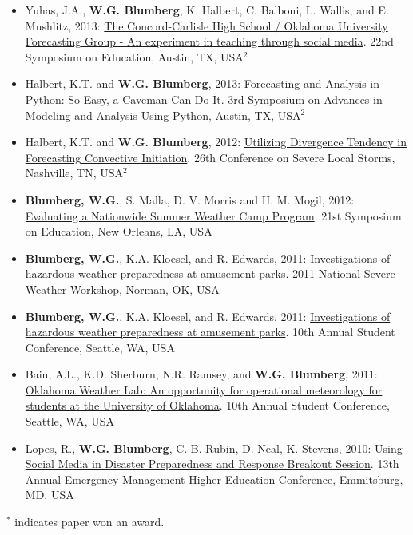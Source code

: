 \documentclass[10pt]{res} %
\begin{document}
\begin{resume}
\begin{itemize}
\item Yuhas, J.A., \textbf{W.G. Blumberg}, K. Halbert, C. Balboni, L. Wallis, and E. Mushlitz, 2013: \href{https://ams.confex.com/ams/93Annual/webprogram/Paper221498.html}{The Concord-Carlisle High School / Oklahoma University Forecasting Group - An experiment in teaching through social media}. 22nd Symposium on Education, Austin, TX, USA$^{2}$
\item Halbert, K.T. and \textbf{W.G. Blumberg}, 2013: \href{https://ams.confex.com/ams/93Annual/webprogram/Paper213476.html}{Forecasting and Analysis in Python: So Easy, a Caveman Can Do It}. 3rd Symposium on Advances in Modeling and Analysis Using Python, Austin, TX, USA$^{2}$
\item Halbert, K.T. and \textbf{W.G. Blumberg}, 2012: \href{https://ams.confex.com/ams/26SLS/webprogram/Paper211764.html}{Utilizing Divergence Tendency in Forecasting Convective Initiation}. 26th Conference on Severe Local Storms, Nashville, TN, USA$^{2}$
\item \textbf{Blumberg, W.G.}, S. Malla, D. V. Morris and H. M. Mogil, 2012: \href{https://ams.confex.com/ams/92Annual/webprogram/Paper202144.html}{Evaluating a Nationwide Summer Weather Camp Program}. 21st Symposium on Education, New Orleans, LA, USA
\item \textbf{Blumberg, W.G.}, K.A. Kloesel, and R. Edwards, 2011: Investigations of hazardous weather preparedness at amusement parks. 2011 National Severe Weather Workshop, Norman, OK, USA
\item \textbf{Blumberg, W.G.}, K.A. Kloesel, and R. Edwards, 2011: \href{https://ams.confex.com/ams/91Annual/webprogram/Paper188077.html}{Investigations of hazardous weather preparedness at amusement parks}. 10th Annual Student Conference, Seattle, WA, USA
\item Bain, A.L., K.D. Sherburn, N.R. Ramsey, and \textbf{W.G. Blumberg}, 2011: \href{https://ams.confex.com/ams/91Annual/webprogram/Paper187924.html}{Oklahoma Weather Lab: An opportunity for operational meteorology for students at the University of Oklahoma}. 10th Annual Student Conference, Seattle, WA, USA
\item Lopes, R., \textbf{W.G. Blumberg}, C. B. Rubin, D. Neal, K. Stevens, 2010: \href{https://www.google.com/url?sa=t&rct=j&q=&esrc=s&source=web&cd=1&ved=0ahUKEwjBvbushpXQAhXslVQKHZlpBMAQFgglMAA&url=https%3A%2F%2Ftraining.fema.gov%2Fhiedu%2F10conf%2Freport%2Fekorikoh%2520-%2520social%2520media.doc&usg=AFQjCNE7FNRfKak5bogh1utz5eF2gBRarg}{Using Social Media in Disaster Preparedness and Response Breakout Session}. 13th Annual Emergency Management Higher Education Conference, Emmitsburg, MD, USA
\end{itemize}
\hfill$^{*}$ indicates paper won an award.


\end{resume}
\end{document}
